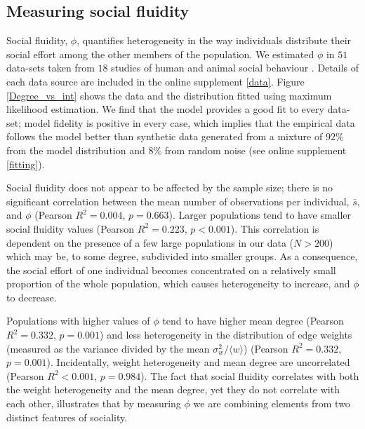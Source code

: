 \documentclass[10pt]{article}
\begin{document}
\begin{multicols}{2}
\subsection{Measuring social fluidity}
Social fluidity, $\phi$, quantifies heterogeneity in the way individuals distribute their social effort among the other members of the population. We estimated $\phi$ in $51$ data-sets taken from $18$ studies of human and animal social behaviour \cite{Smith12052009, borremans2016nonlinear, 10.1371/journal.pone.0023176, 10.1371/journal.pone.0136497, 10.1371/journal.pone.0073970, Carter20122573, Grant1973449, levin2016stress, sailer1984proximity, massen2013stability, sade1972sociometrics, butovskaya1994structure, takahata1991diachronic, hass1991social, lott1979dominance, SCHEIN195545, hobson2015social, 10.1371/journal.pone.0020298}. Details of each data source are included in the online supplement \ref{data}. Figure \ref{Degree_vs_int} shows the data and the distribution fitted using maximum likelihood estimation. We find that the model provides a good fit to every data-set; model fidelity is positive in every case, which implies that the empirical data follows the model better than synthetic data generated from a mixture of $92\%$ from the model distribution and $8\%$ from random noise (see online supplement \ref{fitting}). 

Social fluidity does not appear to be affected by the sample size; there is no significant correlation between the mean number of observations per individual, $\bar{s}$, and $\phi$ (Pearson $R^{2}=0.004$, $p=0.663$). Larger populations tend to have smaller social fluidity values (Pearson $R^{2}=0.223$, $p<0.001$). This correlation is dependent on the presence of a few large populations in our data ($N>200$) which may be, to some degree, subdivided into smaller groups. As a consequence, the social effort of one individual becomes concentrated on a relatively small proportion of the whole population, which causes heterogeneity to increase, and $\phi$ to decrease.

Populations with higher values of $\phi$ tend to have higher mean degree (Pearson $R^{2}=0.332$, $p=0.001$) and less heterogeneity in the distribution of edge weights (measured as the variance divided by the mean $\sigma_{w}^{2}/\langle w\rangle$)  (Pearson $R^{2}=0.332$, $p=0.001$). Incidentally, weight heterogeneity and mean degree are uncorrelated (Pearson $R^{2}<0.001$, $p=0.984$). The fact that social fluidity correlates with both the weight heterogeneity and the mean degree, yet they do not correlate with each other, illustrates that by measuring $\phi$ we are combining elements from two distinct features of sociality.


\end{multicols}
\end{document}
